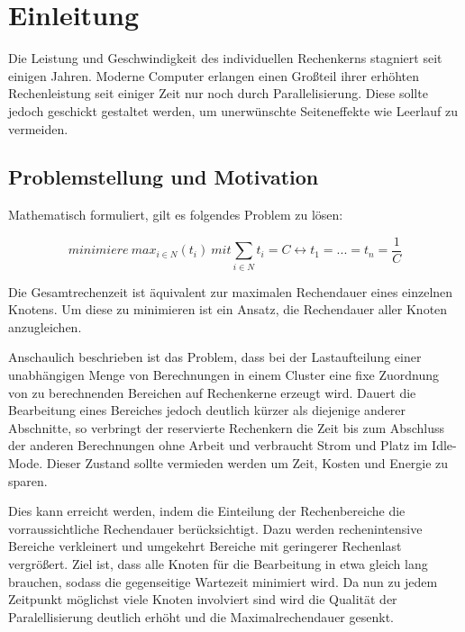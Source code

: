 \section{Einleitung}

Die Leistung und Geschwindigkeit des individuellen Rechenkerns stagniert seit einigen Jahren.
Moderne Computer erlangen einen Großteil ihrer erhöhten Rechenleistung
seit einiger Zeit nur noch durch Parallelisierung.
Diese sollte jedoch geschickt gestaltet werden, um unerwünschte Seiteneffekte
wie Leerlauf zu vermeiden.

\subsection{Problemstellung und Motivation}

Mathematisch formuliert, gilt es folgendes Problem zu lösen:

\begin{equation}
minimiere\ {max_{i \in N}(t_i)}\ mit \sum_{i \in N} {t_i} = C \leftrightarrow t_1 = ... = t_n = \frac{1}{C}
\end{equation}

Die Gesamtrechenzeit ist äquivalent zur maximalen Rechendauer eines einzelnen Knotens.
Um diese zu minimieren ist ein Ansatz, die Rechendauer aller Knoten anzugleichen.

Anschaulich beschrieben ist das Problem, dass bei der Lastaufteilung einer unabhängigen Menge
von Berechnungen in einem Cluster eine fixe Zuordnung von
zu berechnenden Bereichen auf Rechenkerne erzeugt wird. Dauert die Bearbeitung eines Bereiches jedoch deutlich kürzer
als diejenige anderer Abschnitte, so verbringt der reservierte Rechenkern die Zeit bis zum Abschluss der anderen Berechnungen
ohne Arbeit und verbraucht Strom und Platz im Idle-Mode.
Dieser Zustand sollte vermieden werden um Zeit, Kosten und Energie zu sparen.

Dies kann erreicht werden, indem die Einteilung der Rechenbereiche die vorraussichtliche Rechendauer berücksichtigt.
Dazu werden rechenintensive Bereiche verkleinert und umgekehrt Bereiche mit geringerer Rechenlast vergrößert.
Ziel ist, dass alle Knoten für die Bearbeitung in etwa gleich lang brauchen,
sodass die gegenseitige Wartezeit minimiert wird.
Da nun zu jedem Zeitpunkt möglichst viele Knoten involviert sind wird die Qualität der Paralellisierung deutlich erhöht
und die Maximalrechendauer gesenkt.

